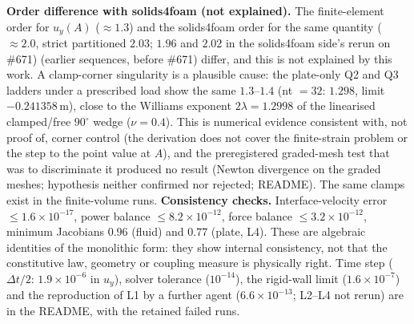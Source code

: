 \documentclass[sn-mathphys,Numbered]{sn-jnl}
\newcommand{\legbc}{\textcolor{red!70!black}{(earlier sequences, before \#671)}}
\begin{document}
\textbf{Order difference with solids4foam (not explained).} The finite-element order for $u_y(A)$ ($\approx1.3$) and the solids4foam order for the same quantity ($\approx2.0$, strict partitioned $2.03$; $1.96$ and $2.02$ in the solids4foam side's rerun on \#671) \legbc{} differ, and this is not explained by this work. A clamp-corner singularity is a plausible cause: the plate-only Q2 and Q3 ladders under a prescribed load show the same $1.3$--$1.4$ (nt $=32$: $1.298$, limit $-0.241358\,\mathrm m$), close to the Williams exponent $2\lambda=1.2998$ of the linearised clamped/free $90^\circ$ wedge ($\nu=0.4$). This is numerical evidence consistent with, not proof of, corner control (the derivation does not cover the finite-strain problem or the step to the point value at $A$), and the preregistered graded-mesh test that was to discriminate it produced no result (Newton divergence on the graded meshes; hypothesis neither confirmed nor rejected; README). The same clamps exist in the finite-volume runs.
\textbf{Consistency checks.} Interface-velocity error $\le1.6\times10^{-17}$, power balance $\le8.2\times10^{-12}$, force balance $\le3.2\times10^{-12}$, minimum Jacobians $0.96$ (fluid) and $0.77$ (plate, L4). These are algebraic identities of the monolithic form: they show internal consistency, not that the constitutive law, geometry or coupling measure is physically right. Time step ($\Delta t/2$: $1.9\times10^{-6}$ in $u_y$), solver tolerance ($10^{-14}$), the rigid-wall limit ($1.6\times10^{-7}$) and the reproduction of L1 by a further agent ($6.6\times10^{-13}$; L2--L4 not rerun) are in the README, with the retained failed runs.
\end{document}
